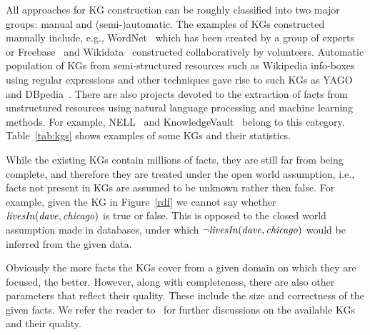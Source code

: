 All approaches for KG construction can be roughly classified into two major groups: manual and (semi-)automatic. The examples of KGs constructed manually include, e.g., WordNet~\cite{wordnet} which has been created by a group of experts or Freebase~\cite{Freebase} and Wikidata~\cite{wikidata} constructed collaboratively by volunteers. 
Automatic population of KGs from semi-structured resources such as Wikipedia info-boxes using regular expressions and other techniques gave rise to such KGs as YAGO~\cite{yago} and DBpedia~\cite{dbpedia}. %
There are also projects %
devoted to the extraction of facts from unstructured resources using natural language processing and machine learning methods. %
For example, NELL~\cite{nell} and KnowledgeVault~\cite{KnowledgeVault} belong to this category. Table~\ref{tab:kgs} shows examples of some KGs and their statistics. %


While the existing KGs contain millions of facts, they are still far from being complete, and therefore they are treated under the open world assumption, i.e., facts not present in KGs are assumed to be unknown rather then false. For example, given the KG in Figure~\ref{rdf} we cannot say whether $\mathit{livesIn(dave,chicago)}$ is true or false. This is opposed to the closed world assumption made in databases, under which $\mathit{\neg livesIn(dave,chicago)}$ would be inferred from the given data.

Obviously the more facts the KGs cover from a given domain on which they are focused, the better. However, along with completeness, there are also other parameters that reflect their quality. These include the size and correctness of the given facts.  We refer the reader to~\cite{Nickel2015ARO,DBLP:journals/semweb/Paulheim17} for further discussions on the available KGs and their quality.




